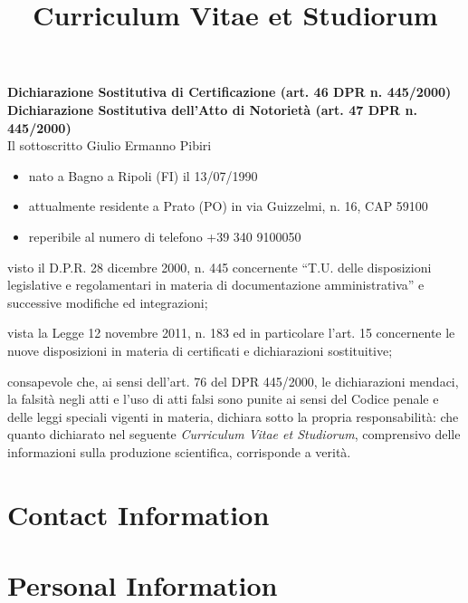\documentclass[a4paper, sans]{moderncv}
\title{Curriculum Vitae et Studiorum}
\newcommand{\return}{\vspace{0.3cm}}
\begin{document}
\textbf{Dichiarazione Sostitutiva di Certificazione (art. 46 DPR n. 445/2000)} \\
\textbf{Dichiarazione Sostitutiva dell'Atto di Notorietà (art. 47 DPR n. 445/2000)} \\

Il sottoscritto Giulio Ermanno Pibiri

\begin{itemize}
    \item nato a Bagno a Ripoli (FI) il 13/07/1990
    \item attualmente residente a Prato (PO) in via Guizzelmi, n. 16, CAP 59100
    \item reperibile al numero di telefono +39 340 9100050
\end{itemize}
\return

visto il D.P.R. 28 dicembre 2000, n. 445 concernente ``T.U. delle disposizioni
legislative e regolamentari in materia di documentazione amministrativa''
e successive modifiche ed integrazioni;
\return

vista la Legge 12 novembre 2011, n. 183 ed in particolare l'art. 15 concernente
le nuove disposizioni in materia di certificati e dichiarazioni sostituitive;
\return

consapevole che, ai sensi dell'art. 76 del DPR 445/2000, le dichiarazioni mendaci,
la falsità negli atti e l'uso di atti falsi sono punite ai sensi del Codice penale
e delle leggi speciali vigenti in materia,
dichiara sotto la propria responsabilità:
che quanto dichiarato nel seguente \emph{Curriculum Vitae et Studiorum},
comprensivo delle informazioni sulla produzione scientifica, corrisponde a verità.

\vspace{6cm}



\makecvtitle

\section{Contact Information}

\section{Personal Information}
\end{document}
